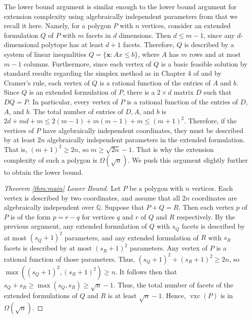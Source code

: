 \documentclass[centering,11pt,reqno]{amsart}
\theoremstyle{definition}
\DeclareMathOperator{\vxc}{vxc}
\begin{document}
The lower bound argument is similar enough to the lower bound argument for extension complexity using algebraically independent parameters from \cite{PolygonExtensions} that we recall it here. Namely, for a polygon $P$ with $n$ vertices, consider an extended formulation $Q$ of $P$ with $m$ facets in $d$ dimensions. Then $d \leq m-1$, since any $d$-dimensional polytope has at least $d+1$ facets. Therefore, $Q$ is described by a system of linear inequalities $Q = \{\mathbf{x}: Ax \leq b\}$, where $A$ has $m$ rows and at most $m-1$ columns. Furthermore, since each vertex of $Q$ is a basic feasible solution by standard results regarding the simplex method as in Chapter 4 of \cite{GartnerBook} and by Cramer's rule, each vertex of $Q$ is a rational function of the entries of $A$ and $b$. Since $Q$ is an extended formulation of $P$, there is a $2 \times d$ matrix $D$ such that $DQ = P$. In particular, every vertex of $P$ is a rational function of the entries of $D$, $A$, and $b$. The total number of entries of $D, A$, and $b$ is $2d + md + m \leq 2(m-1)+m(m-1) +m \leq (m+1)^{2}.$ Therefore, if the vertices of $P$ have algebraically independent coordinates, they must be described by at least $2n$ algebraically independent parameters in the extended formulation. That is, $(m+1)^{2} \geq 2n$, so $m \geq \sqrt{2n}-1$. That is why the extension complexity of such a polygon is $\Omega(\sqrt{n})$. We push this argument slightly further to obtain the lower bound.

\begin{proof}[Theorem \ref{thm:main} Lower Bound]

Let $P$ be a polygon with $n$ vertices. Each vertex is described by two coordinates, and assume that all $2n$ coordinates are algebraically independent over $\mathbb{Q}$. Suppose that $P + Q = R$. Then each vertex $p$ of $P$ is of the form $p = r - q$ for vertices $q$ and $r$ of $Q$ and $R$ respectively. By the previous argument, any extended formulation of $Q$ with $s_Q$ facets is described by at most $(s_Q+1)^{2}$ parameters, and any extended formulation of $R$ with $s_R$ facets is described by at most $(s_R+1)^{2}$ parameters. Any vertex of $P$ is a rational function of those parameters. Thus, $(s_Q+1)^{2} + (s_R+1)^{2} \geq 2n$, so $\max((s_Q+1)^{2}, (s_R+1)^{2}) \geq n$. It follows then that $s_Q+s_R \geq \max(s_Q,s_R) \geq \sqrt{n} - 1$. Thus, the total number of facets of the extended formulations of $Q$ and $R$ is at least $\sqrt{n} - 1$. Hence, $\vxc(P)$ is in $\Omega(\sqrt{n})$. 
\end{proof}
\end{document}
